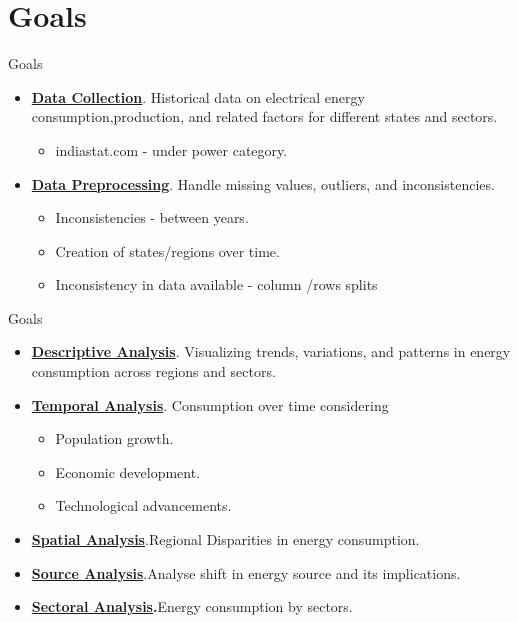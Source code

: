 \documentclass{beamer}
\begin{document}
\section{Goals}
\begin{frame}{Goals}
    \begin{itemize}
        \item \textbf{\underline{Data Collection}}. Historical data on electrical energy consumption,production, and related factors for different states and sectors.
        \begin{itemize}
            \item indiastat.com - under power category.
        \end{itemize}
        \pause
        \item \textbf{\underline{Data Preprocessing}}. Handle missing values, outliers, and inconsistencies.
        \begin{itemize}
            \item Inconsistencies - between years.
            \item Creation of states/regions over time.
            \item Inconsistency in data available - column /rows splits
        \end{itemize}
        
        
        
    \end{itemize}
\end{frame}
\begin{frame}{Goals}
    \begin{itemize}
        \item \textbf{\underline{Descriptive Analysis}}. Visualizing trends, variations, and patterns in energy consumption across regions and sectors.
        \pause
        \item \textbf{\underline{Temporal Analysis}}. Consumption  over time considering
        \begin{itemize}
            \item Population growth.
            \item Economic development.
            \item Technological advancements.
        \end{itemize}
        \pause
        \item \textbf{\underline{Spatial Analysis}}.Regional Disparities in energy consumption.
        \pause
        \item \textbf{\underline{Source Analysis}}.Analyse shift in energy source and its implications.
        \pause
        \item \textbf{\underline{Sectoral Analysis}.}Energy consumption by sectors.
        
        
    \end{itemize}
\end{frame}
\end{document}
